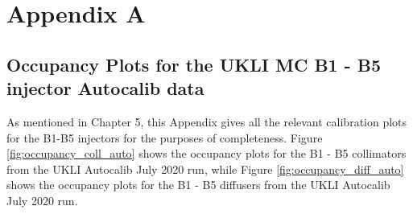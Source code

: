 \chapter{Appendix A}

\section{Occupancy Plots for the UKLI MC B1 - B5 injector Autocalib data}

As mentioned in Chapter 5, this Appendix gives all the relevant calibration plots for the B1-B5 injectors for the purposes of completeness. Figure \ref{fig:occupancy_coll_auto} shows the occupancy plots for the B1 - B5 collimators from the UKLI Autocalib July 2020 run, while  Figure \ref{fig:occupancy_diff_auto} shows the occupancy plots for the B1 - B5 diffusers from the UKLI Autocalib July 2020 run.

